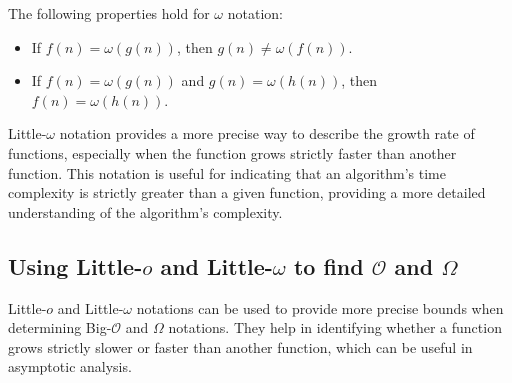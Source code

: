 The following properties hold for $\omega$ notation:
\begin{itemize}
    \item If $f(n) = \omega(g(n))$, then $g(n) \neq \omega(f(n))$.
    \item If $f(n) = \omega(g(n))$ and $g(n) = \omega(h(n))$, then $f(n) = \omega(h(n))$.
\end{itemize}


Little-$\omega$ notation provides a more precise way to describe the growth rate of functions, especially when the function grows strictly faster than another function. This notation is useful for indicating that an algorithm's time complexity is strictly greater than a given function, providing a more detailed understanding of the algorithm's complexity. 

\subsection*{Using Little-\texorpdfstring{$o$}{o} and Little-\texorpdfstring{$\omega$}{omega} to find \texorpdfstring{$\mathcal{O}$}{O} and \texorpdfstring{$\Omega$}{Omega}}
Little-$o$ and Little-$\omega$ notations can be used to provide more precise bounds when determining Big-$\mathcal{O}$ and $\Omega$ notations. They help in identifying whether a function grows strictly slower or faster than another function, which can be useful in asymptotic analysis.

